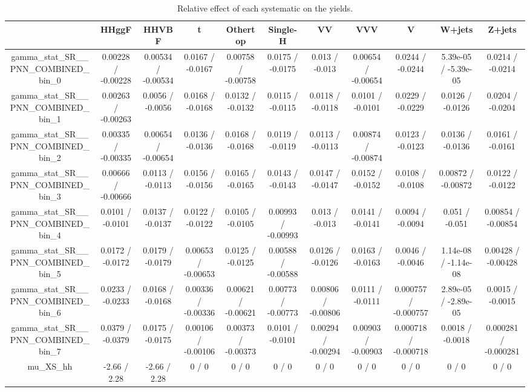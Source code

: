 \documentclass[10pt]{article}
\begin{document}
\begin{table}[htbp]
\begin{center}
\begin{tabular}{|c|c|c|c|c|c|c|c|c|c|c|}
\hline 
      & HHggF      & HHVBF      & t      & Othertop      & Single-H      & VV      & VVV      & V      & W+jets      & Z+jets \\ 
\hline 
  gamma_stat_SR__PNN_COMBINED_bin_0 & 0.00228 / -0.00228 & 0.00534 / -0.00534 & 0.0167 / -0.0167 & 0.00758 / -0.00758 & 0.0175 / -0.0175 & 0.013 / -0.013 & 0.00654 / -0.00654 & 0.0244 / -0.0244 & 5.39e-05 / -5.39e-05 & 0.0214 / -0.0214 \\ 
  gamma_stat_SR__PNN_COMBINED_bin_1 & 0.00263 / -0.00263 & 0.0056 / -0.0056 & 0.0168 / -0.0168 & 0.0132 / -0.0132 & 0.0115 / -0.0115 & 0.0118 / -0.0118 & 0.0101 / -0.0101 & 0.0229 / -0.0229 & 0.0126 / -0.0126 & 0.0204 / -0.0204 \\ 
  gamma_stat_SR__PNN_COMBINED_bin_2 & 0.00335 / -0.00335 & 0.00654 / -0.00654 & 0.0136 / -0.0136 & 0.0168 / -0.0168 & 0.0119 / -0.0119 & 0.0113 / -0.0113 & 0.00874 / -0.00874 & 0.0123 / -0.0123 & 0.0136 / -0.0136 & 0.0161 / -0.0161 \\ 
  gamma_stat_SR__PNN_COMBINED_bin_3 & 0.00666 / -0.00666 & 0.0113 / -0.0113 & 0.0156 / -0.0156 & 0.0165 / -0.0165 & 0.0143 / -0.0143 & 0.0147 / -0.0147 & 0.0152 / -0.0152 & 0.0108 / -0.0108 & 0.00872 / -0.00872 & 0.0122 / -0.0122 \\ 
  gamma_stat_SR__PNN_COMBINED_bin_4 & 0.0101 / -0.0101 & 0.0137 / -0.0137 & 0.0122 / -0.0122 & 0.0105 / -0.0105 & 0.00993 / -0.00993 & 0.013 / -0.013 & 0.0141 / -0.0141 & 0.0094 / -0.0094 & 0.051 / -0.051 & 0.00854 / -0.00854 \\ 
  gamma_stat_SR__PNN_COMBINED_bin_5 & 0.0172 / -0.0172 & 0.0179 / -0.0179 & 0.00653 / -0.00653 & 0.0125 / -0.0125 & 0.00588 / -0.00588 & 0.0126 / -0.0126 & 0.0163 / -0.0163 & 0.0046 / -0.0046 & 1.14e-08 / -1.14e-08 & 0.00428 / -0.00428 \\ 
  gamma_stat_SR__PNN_COMBINED_bin_6 & 0.0233 / -0.0233 & 0.0168 / -0.0168 & 0.00336 / -0.00336 & 0.00621 / -0.00621 & 0.00773 / -0.00773 & 0.00806 / -0.00806 & 0.0111 / -0.0111 & 0.000757 / -0.000757 & 2.89e-05 / -2.89e-05 & 0.0015 / -0.0015 \\ 
  gamma_stat_SR__PNN_COMBINED_bin_7 & 0.0379 / -0.0379 & 0.0175 / -0.0175 & 0.00106 / -0.00106 & 0.00373 / -0.00373 & 0.0101 / -0.0101 & 0.00294 / -0.00294 & 0.00903 / -0.00903 & 0.000718 / -0.000718 & 0.0018 / -0.0018 & 0.000281 / -0.000281 \\ 
  mu_XS_hh & -2.66 / 2.28 & -2.66 / 2.28 & 0 / 0 & 0 / 0 & 0 / 0 & 0 / 0 & 0 / 0 & 0 / 0 & 0 / 0 & 0 / 0 \\ 
\hline 
\end{tabular} 
\caption{Relative effect of each systematic on the yields.} 
\end{center} 
\end{table} 
\end{document}
